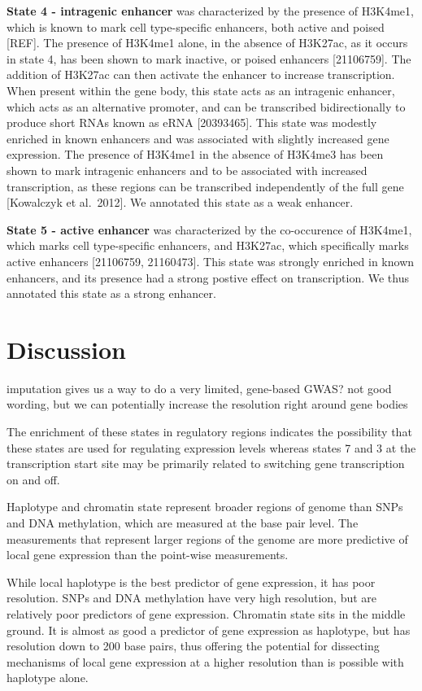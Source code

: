 \documentclass[10pt,letterpaper]{article}
\begin{document}
\textbf{State 4 - intragenic enhancer} was characterized by the presence
of H3K4me1, which is known to mark cell type-specific enhancers, both
active and poised {[}REF{]}. The presence of H3K4me1 alone, in the
absence of H3K27ac, as it occurs in state 4, has been shown to mark
inactive, or poised enhancers {[}21106759{]}. The addition of H3K27ac
can then activate the enhancer to increase transcription. When present
within the gene body, this state acts as an intragenic enhancer, which
acts as an alternative promoter, and can be transcribed bidirectionally
to produce short RNAs known as eRNA {[}20393465{]}. This state was
modestly enriched in known enhancers and was associated with slightly
increased gene expression. The presence of H3K4me1 in the absence of
H3K4me3 has been shown to mark intragenic enhancers and to be associated
with increased transcription, as these regions can be transcribed
independently of the full gene {[}Kowalczyk et al.~2012{]}. We annotated
this state as a weak enhancer.

\textbf{State 5 - active enhancer} was characterized by the co-occurence
of H3K4me1, which marks cell type-specific enhancers, and H3K27ac, which
specifically marks active enhancers {[}21106759, 21160473{]}. This state
was strongly enriched in known enhancers, and its presence had a strong
postive effect on transcription. We thus annotated this state as a
strong enhancer.

\hypertarget{discussion}{%
\section{Discussion}\label{discussion}}

imputation gives us a way to do a very limited, gene-based GWAS? not
good wording, but we can potentially increase the resolution right
around gene bodies

The enrichment of these states in regulatory regions indicates the
possibility that these states are used for regulating expression levels
whereas states 7 and 3 at the transcription start site may be primarily
related to switching gene transcription on and off.

Haplotype and chromatin state represent broader regions of genome than
SNPs and DNA methylation, which are measured at the base pair level. The
measurements that represent larger regions of the genome are more
predictive of local gene expression than the point-wise measurements.

While local haplotype is the best predictor of gene expression, it has
poor resolution. SNPs and DNA methylation have very high resolution, but
are relatively poor predictors of gene expression. Chromatin state sits
in the middle ground. It is almost as good a predictor of gene
expression as haplotype, but has resolution down to 200 base pairs, thus
offering the potential for dissecting mechanisms of local gene
expression at a higher resolution than is possible with haplotype alone.
\end{document}

